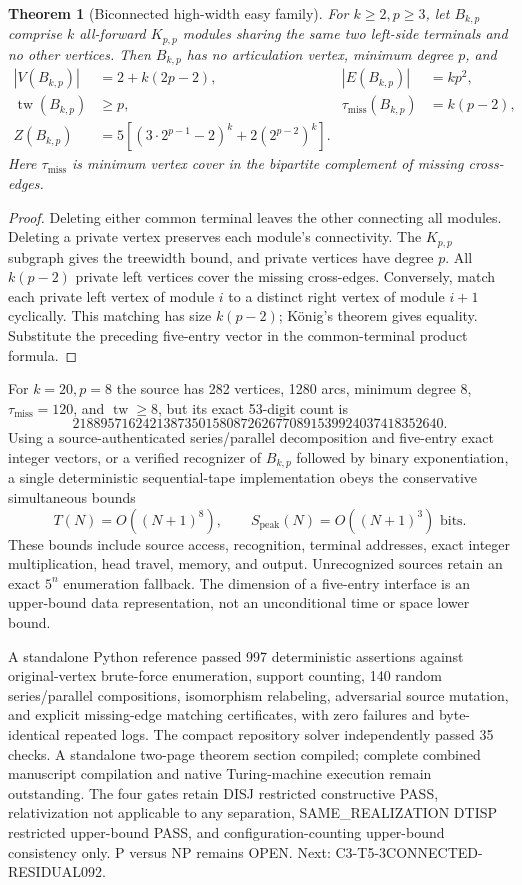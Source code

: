 \documentclass[11pt]{article}
\newtheorem{theorem}{Theorem}
\begin{document}
\begin{theorem}[Biconnected high-width easy family]
For $k\ge2,p\ge3$, let $B_{k,p}$ comprise $k$ all-forward
$K_{p,p}$ modules sharing the same two left-side terminals and
no other vertices. Then $B_{k,p}$ has no articulation vertex,
minimum degree $p$, and
\[
\begin{aligned}
|V(B_{k,p})|&=2+k(2p-2),&
|E(B_{k,p})|&=kp^2,\\
\operatorname{tw}(B_{k,p})&\ge p,&
\tau_{\mathrm{miss}}(B_{k,p})&=k(p-2),\\
Z(B_{k,p})&=5\left[(3\cdot 2^{p-1}-2)^k+
2(2^{p-2})^k\right].
\end{aligned}
\]
Here $\tau_{\mathrm{miss}}$ is minimum vertex cover in the
bipartite complement of missing cross-edges.
\end{theorem}
\begin{proof}
Deleting either common terminal leaves the other connecting
all modules. Deleting a private vertex preserves each module's
connectivity. The $K_{p,p}$ subgraph gives the treewidth bound,
and private vertices have degree $p$. All $k(p-2)$ private left
vertices cover the missing cross-edges. Conversely, match each
private left vertex of module $i$ to a distinct right vertex
of module $i+1$ cyclically. This matching has size $k(p-2)$;
K\"onig's theorem gives equality. Substitute the preceding
five-entry vector in the common-terminal product formula.
\end{proof}

For $k=20,p=8$ the source has 282 vertices, 1280 arcs,
minimum degree 8, $\tau_{\mathrm{miss}}=120$, and
$\operatorname{tw}\ge8$, but its exact 53-digit count is
\[
21889571624213873501580872626770891539924037418352640.
\]
Using a source-authenticated series/parallel decomposition and
five-entry exact integer vectors, or a verified recognizer of
$B_{k,p}$ followed by binary exponentiation, a single
deterministic sequential-tape implementation obeys the
conservative simultaneous bounds
\[
T(N)=O((N+1)^8),\qquad S_{\mathrm{peak}}(N)=O((N+1)^3)
\text{ bits}.
\]
These bounds include source access, recognition, terminal addresses,
exact integer multiplication, head travel, memory, and output.
Unrecognized sources retain an exact $5^n$ enumeration fallback.
The dimension of a five-entry interface is an upper-bound data
representation, not an unconditional time or space lower bound.

A standalone Python reference passed 997 deterministic assertions
against original-vertex brute-force enumeration, support counting,
140 random series/parallel compositions, isomorphism relabeling,
adversarial source mutation, and explicit missing-edge matching
certificates, with zero failures and byte-identical repeated logs.
The compact repository solver independently passed 35 checks.
A standalone two-page theorem section compiled; complete combined
manuscript compilation and native Turing-machine execution remain
outstanding. The four gates retain DISJ restricted constructive PASS,
relativization not applicable to any separation, SAME\_REALIZATION
DTISP restricted upper-bound PASS, and configuration-counting
upper-bound consistency only. P versus NP remains OPEN.
Next: C3-T5-3CONNECTED-RESIDUAL092.
\end{document}
